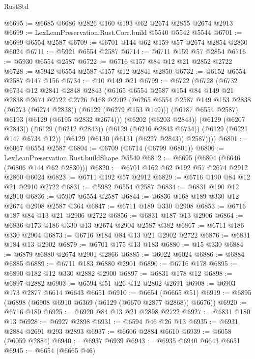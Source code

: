 \begin{lexlean}{RustStd}
\begin{coremodule}
@6695 := @6685 @6686 @2826 @160 @193 @62 @2674 @2855 @2674 @2913
@6699 := LexLeanPreservation.Rust.Corr.build @5540 @5542 @5544
@6701 := @6699 @6554 @2587
@6709 := @6701 @144 @62 @159 @57 @2674 @2854 @2830 @6024
@6711 := @5921 @6554 @2587
@6714 := @6711 @159 @57 @2854
@6716 := @5930 @6554 @2587
@6722 := @6716 @157 @84 @12 @21 @2852 @2722
@6728 := @5942 @6554 @2587 @157 @12 @2841 @2850
@6732 := @6152 @6554 @2587 @147 @156
@6734 := @10 @149 @21
@6799 := @6722
    (@6728
      (@6732
        @6734
        @12
        @2841
        @2848
        @2843
        (@6165
          @6554
          @2587
          @154
          @84
          @149
          @21
          @2838
          @2674
          @2722
          @2726
          @168
          @2702
          (@6265 @6554 @2587 @149 @153 @2838 (@6273 (@6274 @2838)) (@6129 (@6279 @153 @149)))
          (@6187 @6554 @2587)
          @6193
          (@6129 (@6195 @2832 @2674)))
        (@6202 (@6203 @2843))
        (@6129 (@6207 @2843))
        (@6129 (@6212 @2843))
        (@6129 (@6216 @2843 @6734))
        (@6129 (@6221 @147 @6734 @12))
        (@6129 (@6130 (@6131 (@6227 @2843)) @2587))))
@6801 := @6067 @6554 @2587
@6804 := @6709 (@6714 (@6799 @6801))
@6806 := LexLeanPreservation.Rust.buildShape @5540
@6812 := @6695 (@6804 (@6646 (@6806 @144 @62 @2830)))
@6820 := @6701 @162 @62 @192 @57 @2674 @2912 @2860 @6024
@6823 := @6711 @192 @57 @2912
@6829 := @6716 @190 @84 @12 @21 @2910 @2722
@6831 := @5982 @6554 @2587
@6834 := @6831 @190 @12 @2910
@6836 := @5907 @6554 @2587
@6844 := @6836 @168 @189 @330 @12 @2674 @2908 @2587 @364
@6847 := @6711 @189 @330 @2908
@6853 := @6716 @187 @84 @13 @21 @2906 @2722
@6856 := @6831 @187 @13 @2906
@6864 := @6836 @173 @186 @330 @13 @2674 @2904 @2587 @382
@6867 := @6711 @186 @330 @2904
@6873 := @6716 @184 @84 @13 @21 @2902 @2722
@6876 := @6831 @184 @13 @2902
@6879 := @6701 @175 @13 @183
@6880 := @15 @330
@6884 := @6879 @6880 @2674 @2901 @2866
@6885 := @6022 @6024
@6886 := @6884 @6885
@6889 := @6711 @183 @6880 @2901
@6890 := @6716 @178
@6895 := @6890 @182 @12 @330 @2882 @2900
@6897 := @6831 @178 @12
@6898 := @6897 @2882
@6903 := @6594 @51 @26 @12 @2802 @2691
@6908 := @6903 @173 @2877 @6614 @6643 @6651
@6910 := @6654 (@6665 @51)
@6919 := @6895 (@6898 (@6908 @6910 @6369 (@6129 (@6670 @2877 @2868)) @6676))
@6920 := @6716 @180
@6925 := @6920 @84 @13 @21 @2898 @2722
@6927 := @6831 @180 @13
@6928 := @6927 @2898
@6931 := @6594 @46 @26 @13
@6935 := @6931 @2884 @2691 @293 @2893
@6937 := @6606 @2884 @6610
@6939 := @6058 (@6059 @2884)
@6940 := @6937 @6939
@6943 := @6935 @6940 @6643 @6651
@6945 := @6654 (@6665 @46)

\end{coremodule}
\end{lexlean}
